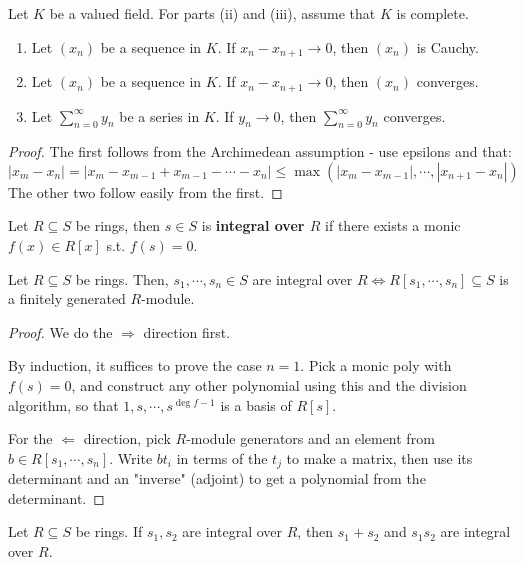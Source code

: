 \documentclass[a4paper]{article}
\begin{document}
{\begin{prop-num}
	Let $K$ be a valued field. For parts (ii) and (iii), assume that $K$ is complete.
	\begin{enumerate}
		\item Let $(x_n)$ be a sequence in $K$. If $x_n-x_{n+1}\rightarrow0$, then $(x_n)$ is Cauchy.\\
		\item Let $(x_n)$ be a sequence in $K$. If $x_n-x_{n+1}\rightarrow0$, then $(x_n)$ converges.\\
		\item Let $\sum_{n=0}^{\infty}y_n$ be a series in $K$. If $y_n\rightarrow0$, then $\sum_{n=0}^{\infty}y_n$ converges.
	\end{enumerate}
\end{prop-num}
\begin{proof}
	The first follows from the Archimedean assumption - use epsilons and that: $$\left|x_m-x_n\right|=\left|x_m-x_{m-1}+x_{m-1}-\cdots-x_n\right|\leq\max(\left|x_m-x_{m-1}\right|,\cdots,\left|x_{n+1}-x_{n}\right|)$$
	The other two follow easily from the first.
\end{proof}

\begin{defi-num}
	Let $R\subseteq S$ be rings, then $s\in S$ is \textbf{integral over $R$} if there exists a monic $f(x)\in R[x]$ s.t. $f(s)=0$.
\end{defi-num}

\begin{prop-num}
	Let $R\subseteq S$ be rings. Then, $s_1,\cdots,s_n\in S$ are integral over $R\iff R[s_1,\cdots,s_n]\subseteq S$ is a finitely generated $R$-module.
\end{prop-num}
\begin{proof}
	We do the $\Rightarrow$ direction first.
	
	By induction, it suffices to prove the case $n=1$. Pick a monic poly with $f(s)=0$, and construct any other polynomial using this and the division algorithm, so that $1,s,\cdots,s^{\deg f-1}$ is a basis of $R[s]$.
	
	For the $\Leftarrow$ direction, pick $R$-module generators and an element from $b\in R[s_1,\cdots,s_n]$. Write $bt_i$ in terms of the $t_j$ to make a matrix, then use its determinant and an "inverse" (adjoint) to get a polynomial from the determinant.
\end{proof}

\begin{cor-num}
	Let $R\subseteq S$ be rings. If $s_1, s_2$ are integral over $R$, then $s_1+s_2$ and $s_1s_2$ are integral over $R$.
	

\end{cor-num}}
\end{document}
